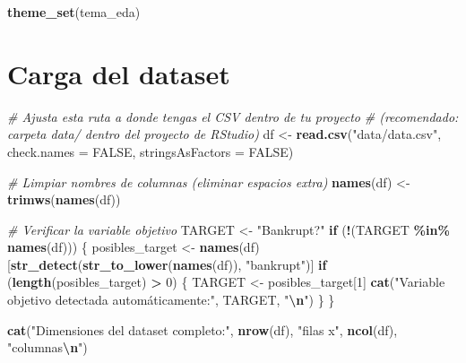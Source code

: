 \documentclass[
]{book}
\newenvironment{Shaded}{\begin{snugshade}}{\end{snugshade}}
\newcommand{\AttributeTok}[1]{\textcolor[rgb]{0.13,0.29,0.53}{#1}}
\newcommand{\CommentTok}[1]{\textcolor[rgb]{0.56,0.35,0.01}{\textit{#1}}}
\newcommand{\ConstantTok}[1]{\textcolor[rgb]{0.56,0.35,0.01}{#1}}
\newcommand{\ControlFlowTok}[1]{\textcolor[rgb]{0.13,0.29,0.53}{\textbf{#1}}}
\newcommand{\DecValTok}[1]{\textcolor[rgb]{0.00,0.00,0.81}{#1}}
\newcommand{\FunctionTok}[1]{\textcolor[rgb]{0.13,0.29,0.53}{\textbf{#1}}}
\newcommand{\NormalTok}[1]{#1}
\newcommand{\OtherTok}[1]{\textcolor[rgb]{0.56,0.35,0.01}{#1}}
\newcommand{\SpecialCharTok}[1]{\textcolor[rgb]{0.81,0.36,0.00}{\textbf{#1}}}
\newcommand{\StringTok}[1]{\textcolor[rgb]{0.31,0.60,0.02}{#1}}
\begin{document}
\begin{Shaded}
\begin{Highlighting}[]
\FunctionTok{theme\_set}\NormalTok{(tema\_eda)}
\end{Highlighting}
\end{Shaded}

\section{Carga del dataset}\label{carga-del-dataset}

\begin{Shaded}
\begin{Highlighting}[]
\CommentTok{\# Ajusta esta ruta a donde tengas el CSV dentro de tu proyecto}
\CommentTok{\# (recomendado: carpeta data/ dentro del proyecto de RStudio)}
\NormalTok{df }\OtherTok{\textless{}{-}} \FunctionTok{read.csv}\NormalTok{(}\StringTok{"data/data.csv"}\NormalTok{, }\AttributeTok{check.names =} \ConstantTok{FALSE}\NormalTok{, }\AttributeTok{stringsAsFactors =} \ConstantTok{FALSE}\NormalTok{)}

\CommentTok{\# Limpiar nombres de columnas (eliminar espacios extra)}
\FunctionTok{names}\NormalTok{(df) }\OtherTok{\textless{}{-}} \FunctionTok{trimws}\NormalTok{(}\FunctionTok{names}\NormalTok{(df))}

\CommentTok{\# Verificar la variable objetivo}
\NormalTok{TARGET }\OtherTok{\textless{}{-}} \StringTok{"Bankrupt?"}
\ControlFlowTok{if}\NormalTok{ (}\SpecialCharTok{!}\NormalTok{(TARGET }\SpecialCharTok{\%in\%} \FunctionTok{names}\NormalTok{(df))) \{}
\NormalTok{  posibles\_target }\OtherTok{\textless{}{-}} \FunctionTok{names}\NormalTok{(df)[}\FunctionTok{str\_detect}\NormalTok{(}\FunctionTok{str\_to\_lower}\NormalTok{(}\FunctionTok{names}\NormalTok{(df)), }\StringTok{"bankrupt"}\NormalTok{)]}
  \ControlFlowTok{if}\NormalTok{ (}\FunctionTok{length}\NormalTok{(posibles\_target) }\SpecialCharTok{\textgreater{}} \DecValTok{0}\NormalTok{) \{}
\NormalTok{    TARGET }\OtherTok{\textless{}{-}}\NormalTok{ posibles\_target[}\DecValTok{1}\NormalTok{]}
    \FunctionTok{cat}\NormalTok{(}\StringTok{"Variable objetivo detectada automáticamente:"}\NormalTok{, TARGET, }\StringTok{"}\SpecialCharTok{\textbackslash{}n}\StringTok{"}\NormalTok{)}
\NormalTok{  \}}
\NormalTok{\}}

\FunctionTok{cat}\NormalTok{(}\StringTok{"Dimensiones del dataset completo:"}\NormalTok{, }\FunctionTok{nrow}\NormalTok{(df), }\StringTok{"filas x"}\NormalTok{, }\FunctionTok{ncol}\NormalTok{(df), }\StringTok{"columnas}\SpecialCharTok{\textbackslash{}n}\StringTok{"}\NormalTok{)}
\end{Highlighting}
\end{Shaded}
\end{document}
